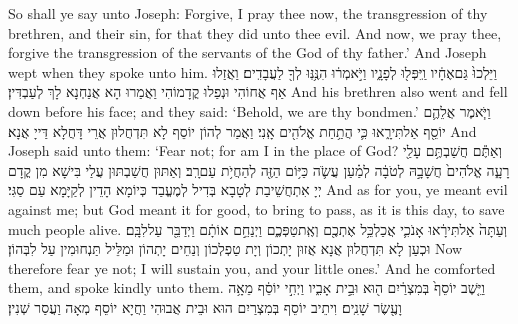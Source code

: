 {So shall ye say unto Joseph: Forgive, I pray thee now, the transgression of thy brethren, and their sin, for that they did unto thee evil. And now, we pray thee, forgive the transgression of the servants of the God of thy father.’ And Joseph wept when they spoke unto him.}{}
{וַיֵּלְכוּ֙ גַּם\maqqaf אֶחָ֔יו וַֽיִּפְּל֖וּ לְפָנָ֑יו וַיֹּ֣אמְר֔וּ הִנֶּ֥נּֽוּ לְךָ֖ לַעֲבָדִֽים׃}
{וַאֲזַלוּ אַף אֲחוֹהִי וּנְפַלוּ קֳדָמוֹהִי וַאֲמַרוּ הָא אֲנַחְנָא לָךְ לְעַבְדִּין׃}
{And his brethren also went and fell down before his face; and they said: ‘Behold, we are thy bondmen.’}{}
{וַיֹּ֧אמֶר אֲלֵהֶ֛ם יוֹסֵ֖ף אַל\maqqaf תִּירָ֑אוּ כִּ֛י הֲתַ֥חַת אֱלֹהִ֖ים אָֽנִי׃}
{וַאֲמַר לְהוֹן יוֹסֵף לָא תִּדְחֲלוּן אֲרֵי דָּחֲלָא דַּייָ אֲנָא׃}
{And Joseph said unto them: ‘Fear not; for am I in the place of God?}{}
{וְאַתֶּ֕ם חֲשַׁבְתֶּ֥ם עָלַ֖י רָעָ֑ה אֱלֹהִים֙ חֲשָׁבָ֣הּ לְטֹבָ֔ה לְמַ֗עַן עֲשֹׂ֛ה כַּיּ֥וֹם הַזֶּ֖ה לְהַחֲיֹ֥ת עַם\maqqaf רָֽב׃}
{וְאַתּוּן חֲשַׁבְתּוּן עֲלַי בִּישָׁא מִן קֳדָם יְיָ אִתְחֲשֵׁיבַת לְטָבָא בְּדִיל לְמֶעֱבַד כְּיוֹמָא הָדֵין לְקַיָּמָא עַם סַגִּי׃}
{And as for you, ye meant evil against me; but God meant it for good, to bring to pass, as it is this day, to save much people alive.}{}
{וְעַתָּה֙ אַל\maqqaf תִּירָ֔אוּ אָנֹכִ֛י אֲכַלְכֵּ֥ל אֶתְכֶ֖ם וְאֶֽת\maqqaf טַפְּכֶ֑ם וַיְנַחֵ֣ם אוֹתָ֔ם וַיְדַבֵּ֖ר עַל\maqqaf לִבָּֽם׃}
{וּכְעַן לָא תִּדְחֲלוּן אֲנָא אֲזוּן יָתְכוֹן וְיָת טַפְלְכוֹן וְנַחֵים יָתְהוֹן וּמַלֵּיל תַּנְחוּמִין עַל לִבְּהוֹן׃}
{Now therefore fear ye not; I will sustain you, and your little ones.’ And he comforted them, and spoke kindly unto them.}{}
{וַיֵּ֤שֶׁב יוֹסֵף֙ בְּמִצְרַ֔יִם ה֖וּא וּבֵ֣ית אָבִ֑יו וַיְחִ֣י יוֹסֵ֔ף מֵאָ֥ה וָעֶ֖שֶׂר שָׁנִֽים׃}
{וִיתֵיב יוֹסֵף בְּמִצְרַיִם הוּא וּבֵית אֲבוּהִי וַחֲיָא יוֹסֵף מְאָה וַעֲסַר שְׁנִין׃}
